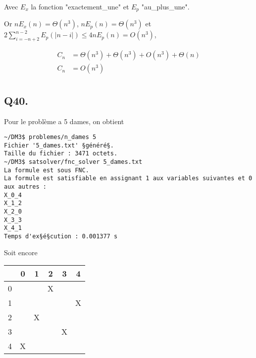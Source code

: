     Avec $E_x$ la fonction "exactement\_une" et $E_p$ "au\_plus\_une".
    
    Or $nE_x(n) = \Theta(n^3)$, $nE_p(n) = \Theta(n^3)$ et
    $2\sum_{i=-n+2}^{n-2}E_p(|n-i|) \leq 4nE_p(n) = O(n^3)$,
    
    \begin{align*}
        C_n &= \Theta(n^3) + \Theta(n^3) + O(n^3) +\Theta(n)\\
        C_n &= \boxed{O(n^3)}\\
    \end{align*}
    
    \subsection*{Q40.}
    Pour le problème a 5 dames, on obtient
    \begin{lstlisting}
~/DM3$ problemes/n_dames 5
Fichier '5_dames.txt' §généré§.
Taille du fichier : 3471 octets.
~/DM3$ satsolver/fnc_solver 5_dames.txt
La formule est sous FNC.
La formule est satisfiable en assignant 1 aux variables suivantes et 0 aux autres :
X_0_4
X_1_2
X_2_0
X_3_3
X_4_1
Temps d'ex§é§cution : 0.001377 s
    \end{lstlisting}
    Soit encore
    \begin{center}
        \begin{tabular}{| c || *{5}{c |}}
        \hline
          & 0 & 1 & 2 & 3 & 4 \\
        \hline
        \hline
        0 &   &   & X &   &   \\
        \hline
        1 &   &   &   &   & X \\
        \hline
        2 &   & X &   &   &   \\
        \hline
        3 &   &   &   & X &   \\
        \hline
        4 & X &   &   &   &   \\
        \hline
        \end{tabular}
    \end{center}
    

